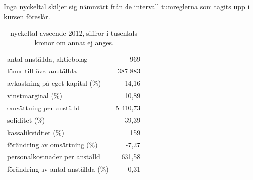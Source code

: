 \documentclass[10pt,a4paper]{article}
\begin{document}
Inga nyckeltal skiljer sig nämnvärt från de intervall tumreglerna som tagits upp i kursen föreslår.
\begin{table}[h]
	\begin{tabular}{ l r }
		antal anställda, aktiebolag & 969\\
		löner till övr. anställda & 387 883\\
		avkastning på eget kapital (\%) & 14,16\\
		vinstmarginal (\%) & 10,89\\
		omsättning per anställd & 5 410,73\\
		soliditet (\%) & 39,39\\
		kassalikviditet (\%) & 159\\
		förändring av omsättning (\%) & -7,27\\
		personalkostnader per anställd & 631,58\\
		förändring av antal anställda (\%) & -0,31\\

	\end{tabular}
	\caption{nyckeltal avseende 2012, siffror i tusentals kronor om annat ej anges.}
	\label{table:nyckeltal}
\end{table}
\end{document}
